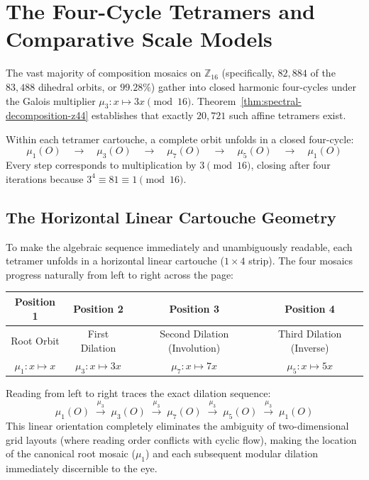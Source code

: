 \section{The Four-Cycle Tetramers and Comparative Scale Models}
\label{sec:tetramers-and-scale-models}

The vast majority of composition mosaics on $\mathbb{Z}_{16}$ (specifically, $82{,}884$ of the $83{,}488$ dihedral orbits, or $99.28\%$) gather into closed harmonic four-cycles under the Galois multiplier $\mu_3 \colon x \mapsto 3x \pmod{16}$. Theorem~\ref{thm:spectral-decomposition-z44} establishes that exactly $20{,}721$ such affine tetramers exist.

Within each tetramer cartouche, a complete orbit unfolds in a closed four-cycle:
\begin{equation}
\label{eqn:tetramer-progression}
\mu_1(O) \quad\longrightarrow\quad \mu_3(O) \quad\longrightarrow\quad \mu_7(O) \quad\longrightarrow\quad \mu_5(O) \quad\longrightarrow\quad \mu_1(O)
\end{equation}
Every step corresponds to multiplication by $3 \pmod{16}$, closing after four iterations because $3^4 \equiv 81 \equiv 1 \pmod{16}$.

\subsection{The Horizontal Linear Cartouche Geometry}

To make the algebraic sequence immediately and unambiguously readable, each tetramer unfolds in a horizontal linear cartouche ($1 \times 4$ strip). The four mosaics progress naturally from left to right across the page:
\begin{center}
\small
\begin{tabular}{cccc}
\toprule
\textbf{Position 1} & \textbf{Position 2} & \textbf{Position 3} & \textbf{Position 4} \\
\midrule
Root Orbit & First Dilation & Second Dilation (Involution) & Third Dilation (Inverse) \\
$\mu_1 \colon x \mapsto x$ & $\mu_3 \colon x \mapsto 3x$ & $\mu_7 \colon x \mapsto 7x$ & $\mu_5 \colon x \mapsto 5x$ \\
\bottomrule
\end{tabular}
\end{center}
Reading from left to right traces the exact dilation sequence:
\[
\mu_1(O) \;\xrightarrow{\mu_3}\; \mu_3(O) \;\xrightarrow{\mu_3}\; \mu_7(O) \;\xrightarrow{\mu_3}\; \mu_5(O) \;\xrightarrow{\mu_3}\; \mu_1(O)
\]
This linear orientation completely eliminates the ambiguity of two-dimensional grid layouts (where reading order conflicts with cyclic flow), making the location of the canonical root mosaic ($\mu_1$) and each subsequent modular dilation immediately discernible to the eye.

